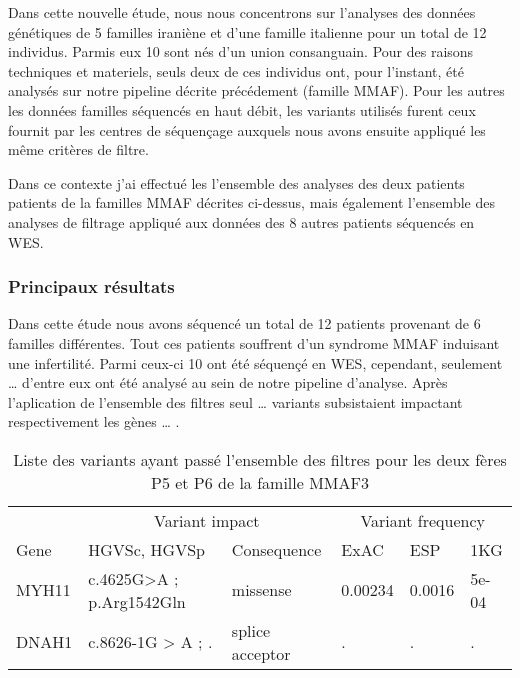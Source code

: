 \documentclass[12pt,twoside]{reedthesis}
\theoremstyle{definition}
\theoremstyle{definition}
\theoremstyle{remark}
\begin{document}
  Dans cette nouvelle étude, nous nous concentrons sur l'analyses des
  données génétiques de 5 familles iraniène et d'une famille italienne
  pour un total de 12 individus. Parmis eux 10 sont nés d'un union
  consanguain. Pour des raisons techniques et materiels, seuls deux de ces
  individus ont, pour l'instant, été analysés sur notre pipeline décrite
  précédement (famille MMAF). Pour les autres les données familles
  séquencés en haut débit, les variants utilisés furent ceux fournit par
  les centres de séquençage auxquels nous avons ensuite appliqué les même
  critères de filtre.
  
  Dans ce contexte j'ai effectué les l'ensemble des analyses des deux
  patients patients de la familles MMAF décrites ci-dessus, mais également
  l'ensemble des analyses de filtrage appliqué aux données des 8 autres
  patients séquencés en WES.
  
  \newpage
  
  
  
  \newpage
  
  \subsubsection{Principaux résultats}\label{principaux-resultats-2}
  
  Dans cette étude nous avons séquencé un total de 12 patients provenant
  de 6 familles différentes. Tout ces patients souffrent d'un syndrome
  MMAF induisant une infertilité. Parmi ceux-ci 10 ont été séquençé en
  WES, cependant, seulement \ldots{} d'entre eux ont été analysé au sein
  de notre pipeline d'analyse. Après l'aplication de l'ensemble des
  filtres seul \ldots{} variants subsistaient impactant respectivement les
  gènes \ldots{} .
  
  \begin{longtable}[t]{llllll}
  \caption{\label{tab:tabrecapmmaf}Liste des variants ayant passé l'ensemble des filtres pour les deux fères P5 et P6 de la famille MMAF3}\\
  \toprule
  \multicolumn{1}{c}{ } & \multicolumn{2}{c}{Variant impact} & \multicolumn{3}{c}{Variant frequency} \\
  \cmidrule(l{2pt}r{2pt}){2-3} \cmidrule(l{2pt}r{2pt}){4-6}
  Gene & HGVSc, HGVSp & Consequence & ExAC & ESP & 1KG\\
  \midrule
  MYH11 & c.4625G>A ; p.Arg1542Gln & missense & 0.00234 & 0.0016 & 5e-04\\
  DNAH1 & c.8626-1G > A ; . & splice acceptor & . & . & .\\
  \bottomrule
  \end{longtable}
  
\end{document}

